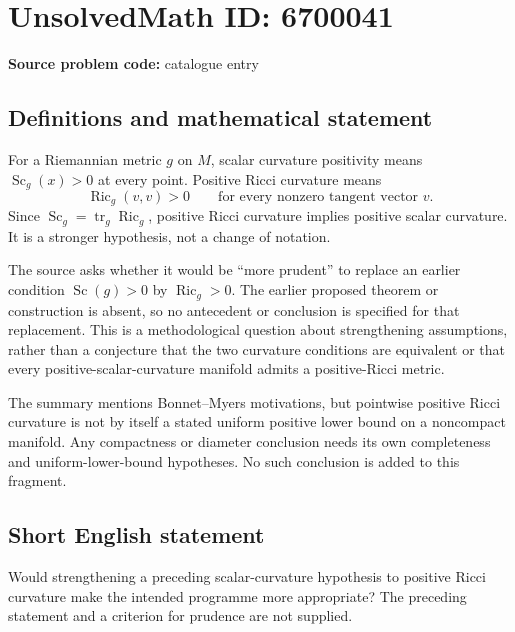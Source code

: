 \documentclass[11pt]{article}
\begin{document}
\section*{UnsolvedMath ID: 6700041}
\textbf{Source problem code:} catalogue entry
\subsection{Definitions and mathematical statement}
For a Riemannian metric $g$ on $M$, scalar curvature positivity means $\operatorname{Sc}_g(x)>0$ at every point. Positive Ricci curvature means
\[
\operatorname{Ric}_g(v,v)>0\qquad\text{for every nonzero tangent vector }v.
\]
Since $\operatorname{Sc}_g=\operatorname{tr}_g\operatorname{Ric}_g$, positive Ricci curvature implies positive scalar curvature. It is a stronger hypothesis, not a change of notation.

The source asks whether it would be ``more prudent'' to replace an earlier condition $\operatorname{Sc}(g)>0$ by $\operatorname{Ric}_g>0$. The earlier proposed theorem or construction is absent, so no antecedent or conclusion is specified for that replacement. This is a methodological question about strengthening assumptions, rather than a conjecture that the two curvature conditions are equivalent or that every positive-scalar-curvature manifold admits a positive-Ricci metric.

The summary mentions Bonnet--Myers motivations, but pointwise positive Ricci curvature is not by itself a stated uniform positive lower bound on a noncompact manifold. Any compactness or diameter conclusion needs its own completeness and uniform-lower-bound hypotheses. No such conclusion is added to this fragment.
\subsection{Short English statement}
Would strengthening a preceding scalar-curvature hypothesis to positive Ricci curvature make the intended programme more appropriate? The preceding statement and a criterion for prudence are not supplied.
\end{document}
